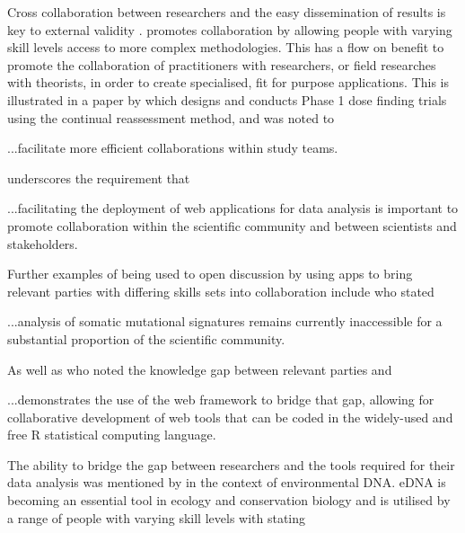 Cross collaboration between researchers and the easy dissemination of results is key to external validity \citep{munafo_manifesto_2017}.   promotes collaboration by allowing people with varying skill levels access to more complex methodologies.  This has a flow on benefit to promote the collaboration of practitioners with researchers, or field researches with theorists, in order to create specialised, fit for purpose applications.  This is illustrated in a paper by \citet{wages_web_2018} which designs and conducts Phase 1 dose finding trials using the continual reassessment method, and was noted to

\begin{displayquote}
	...facilitate more efficient collaborations within study teams.
\end{displayquote}

\citet{klein_webxtreme_2017} underscores the requirement that

\begin{displayquote}
	...facilitating the deployment of web applications for data analysis is important to promote collaboration within the scientific community and between scientists and stakeholders.
\end{displayquote}

Further examples of  being used to open discussion by using apps to bring relevant parties with differing skills sets into collaboration include \citet{diaz-gay_mutational_2018} who stated
\begin{displayquote}
	...analysis of somatic mutational signatures remains currently inaccessible for a substantial proportion of the scientific community.
\end{displayquote}

As well as \citet{whateley_web-based_2015} who noted the knowledge gap between relevant parties and
\begin{displayquote}
	...demonstrates the use of the  web framework to bridge that gap, allowing for collaborative development of web tools that can be coded in the widely-used and free R statistical computing language.
\end{displayquote}

The ability to bridge the gap between researchers and the tools required for their data analysis was mentioned by \citet{chen_interactive_2018} in the context of environmental DNA.  eDNA is becoming an essential tool in ecology and conservation biology and is utilised by a range of people with varying skill levels with \citet{kandlikar_ranacapa_2018} stating

